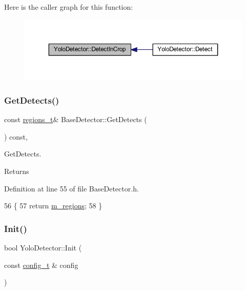 Here is the caller graph for this function\+:\nopagebreak
\begin{figure}[H]
\begin{center}
\leavevmode
\includegraphics[width=350pt]{class_yolo_detector_ad3ca3f52cee36d143b015a3f5f99ebf6_icgraph}
\end{center}
\end{figure}
\mbox{\label{class_base_detector_a52ac4b2feed15a47de84a69eb45c233f}} 
\subsubsection{\texorpdfstring{Get\+Detects()}{GetDetects()}}
{\footnotesize\ttfamily const \mbox{\hyperlink{defines_8h_a01db0de56a20f4342820a093c5154536}{regions\+\_\+t}}\& Base\+Detector\+::\+Get\+Detects (\begin{DoxyParamCaption}{ }\end{DoxyParamCaption}) const\hspace{0.3cm}{\ttfamily [inline]}, {\ttfamily [inherited]}}



Get\+Detects. 

\begin{DoxyReturn}{Returns}

\end{DoxyReturn}


Definition at line 55 of file Base\+Detector.\+h.


\begin{DoxyCode}
56     \{
57         \textcolor{keywordflow}{return} \mbox{\hyperlink{class_base_detector_a409c20093acba261db8354ca72058fce}{m\_regions}};
58     \}
\end{DoxyCode}
\mbox{\label{class_yolo_detector_ac518bc6743145447f19c937c345689c0}} 
\subsubsection{\texorpdfstring{Init()}{Init()}}
{\footnotesize\ttfamily bool Yolo\+Detector\+::\+Init (\begin{DoxyParamCaption}\item[{const \mbox{\hyperlink{defines_8h_a81d657237a541d02f8eeefdd40191920}{config\+\_\+t}} \&}]{config }\end{DoxyParamCaption})\hspace{0.3cm}{\ttfamily [virtual]}}



